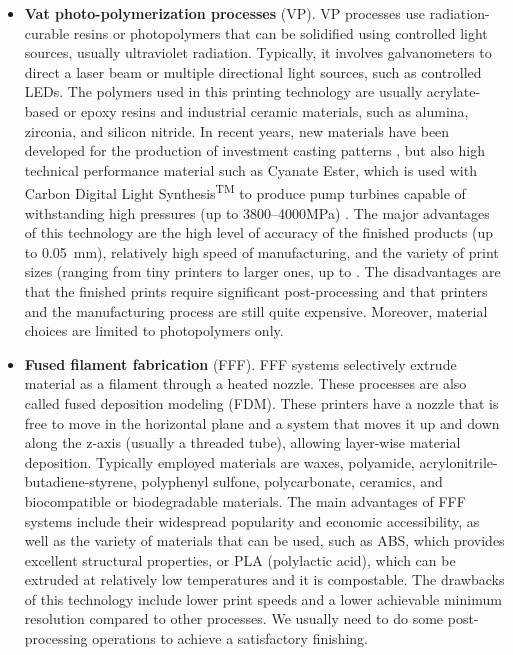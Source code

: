 \begin{itemize}
    \item \textbf{Vat photo-polymerization processes} (VP). VP processes use radiation-curable resins or photopolymers that can be solidified using controlled light sources, usually ultraviolet radiation. Typically, it involves galvanometers to direct a laser beam or multiple directional light sources, such as controlled LEDs. The polymers used in this printing technology are usually acrylate-based or epoxy resins and industrial ceramic materials, such as alumina, zirconia, and silicon nitride. In recent years, new materials have been developed for the production of investment casting patterns \cite{3d_systems_investment_2023}, but also high technical performance material such as Cyanate Ester, which is used with Carbon Digital Light Synthesis\textsuperscript{TM} to produce pump turbines capable of withstanding high pressures (up to \numrange[range-phrase = --]{3800}{4000}\unit{\mega\pascal}) \cite{carbon_3d_carbon_2023}. The major advantages of this technology are the high level of accuracy of the finished products (up to \SI{0.05}{\milli\metre}), relatively high speed of manufacturing, and the variety of print sizes (ranging from tiny printers to larger ones, up to . The disadvantages are that the finished prints require significant post-processing and that printers and the manufacturing process are still quite expensive. Moreover, material choices are limited to photopolymers only.
    \item \textbf{Fused filament fabrication} (FFF). FFF systems selectively extrude material as a filament through a heated nozzle. These processes are also called fused deposition modeling (FDM). These printers have a nozzle that is free to move in the horizontal plane and a system that moves it up and down along the z-axis (usually a threaded tube), allowing layer-wise material deposition. Typically employed materials are waxes, polyamide, acrylonitrile-butadiene-styrene, polyphenyl sulfone, polycarbonate, ceramics, and biocompatible or biodegradable materials. The main advantages of FFF systems include their widespread popularity and economic accessibility, as well as the variety of materials that can be used, such as ABS, which provides excellent structural properties, or PLA (polylactic acid), which can be extruded at relatively low temperatures and it is compostable. The drawbacks of this technology include lower print speeds and a lower achievable minimum resolution compared to other processes. We usually need to do some post-processing operations to achieve a satisfactory finishing.

\end{itemize}
